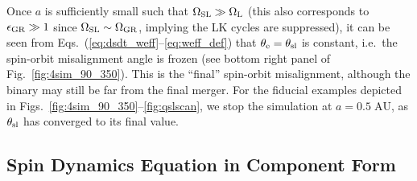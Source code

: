 \documentclass[
        twocolumn,
        twocolappendix
    ]{aastex63}
\begin{document}
Once $a$ is sufficiently small such that $\Omega_{\rm SL} \gg \Omega_{\rm L}$
(this also corresponds to $\epsilon_{\rm GR} \gg 1$ since $\Omega_{\rm SL} \sim
\Omega_{\rm GR}$, implying the LK cycles are suppressed), it can be seen from
Eqs.~(\ref{eq:dsdt_weff}--\ref{eq:weff_def}) that $\theta_{\rm e} = \theta_{\rm
sl}$ is constant, i.e.\ the spin-orbit misalignment angle is frozen (see bottom
right panel of Fig.~\ref{fig:4sim_90_350}). This is the  ``final'' spin-orbit
misalignment, although the binary may still be far from the final merger. For
the fiducial examples depicted in
Figs.~\ref{fig:4sim_90_350}--\ref{fig:qslscan}, we stop the simulation at $a =
0.5\;\mathrm{AU}$, as $\theta_{\rm sl}$ has converged to its final value.

\subsection{Spin Dynamics Equation in Component Form}
\end{document}
